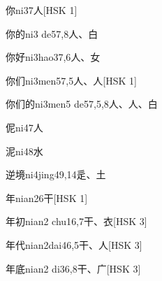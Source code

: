 \begin{entry}{你}{ni3}{7}{⼈}[HSK 1]
\end{entry}

\begin{entry}{你的}{ni3 de5}{7,8}{⼈、⽩}
\end{entry}

\begin{entry}{你好}{ni3hao3}{7,6}{⼈、⼥}
\end{entry}

\begin{entry}{你们}{ni3men5}{7,5}{⼈、⼈}[HSK 1]
\end{entry}

\begin{entry}{你们的}{ni3men5 de5}{7,5,8}{⼈、⼈、⽩}
\end{entry}

\begin{entry}{伲}{ni4}{7}{⼈}
\end{entry}

\begin{entry}{泥}{ni4}{8}{⽔}
\end{entry}

\begin{entry}{逆境}{ni4jing4}{9,14}{⾡、⼟}
\end{entry}

\begin{entry}{年}{nian2}{6}{⼲}[HSK 1]
\end{entry}

\begin{entry}{年初}{nian2 chu1}{6,7}{⼲、⾐}[HSK 3]
\end{entry}

\begin{entry}{年代}{nian2dai4}{6,5}{⼲、⼈}[HSK 3]
\end{entry}

\begin{entry}{年底}{nian2 di3}{6,8}{⼲、⼴}[HSK 3]
\end{entry}

